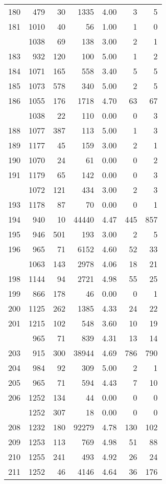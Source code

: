 \documentclass[
]{article}
\begin{document}
\begin{table}
\begin{tabular}[t]{lrrrrrr}
180 & 479 & 30 & 1335 & 4.00 & 3 & 5\\
181 & 1010 & 40 & 56 & 1.00 & 1 & 0\\
\addlinespace
182 & 1038 & 69 & 138 & 3.00 & 2 & 1\\
183 & 932 & 120 & 100 & 5.00 & 1 & 2\\
184 & 1071 & 165 & 558 & 3.40 & 5 & 5\\
185 & 1073 & 578 & 340 & 5.00 & 2 & 5\\
186 & 1055 & 176 & 1718 & 4.70 & 63 & 67\\
\addlinespace
187 & 1038 & 22 & 110 & 0.00 & 0 & 3\\
188 & 1077 & 387 & 113 & 5.00 & 1 & 3\\
189 & 1177 & 45 & 159 & 3.00 & 2 & 1\\
190 & 1070 & 24 & 61 & 0.00 & 0 & 2\\
191 & 1179 & 65 & 142 & 0.00 & 0 & 3\\
\addlinespace
192 & 1072 & 121 & 434 & 3.00 & 2 & 3\\
193 & 1178 & 87 & 70 & 0.00 & 0 & 1\\
194 & 940 & 10 & 44440 & 4.47 & 445 & 857\\
195 & 946 & 501 & 193 & 3.00 & 2 & 5\\
196 & 965 & 71 & 6152 & 4.60 & 52 & 33\\
\addlinespace
197 & 1063 & 143 & 2978 & 4.06 & 18 & 21\\
198 & 1144 & 94 & 2721 & 4.98 & 55 & 25\\
199 & 866 & 178 & 46 & 0.00 & 0 & 1\\
200 & 1125 & 262 & 1385 & 4.33 & 24 & 22\\
201 & 1215 & 102 & 548 & 3.60 & 10 & 19\\
\addlinespace
202 & 965 & 71 & 839 & 4.31 & 13 & 14\\
203 & 915 & 300 & 38944 & 4.69 & 786 & 790\\
204 & 984 & 92 & 309 & 5.00 & 2 & 1\\
205 & 965 & 71 & 594 & 4.43 & 7 & 10\\
206 & 1252 & 134 & 44 & 0.00 & 0 & 0\\
\addlinespace
207 & 1252 & 307 & 18 & 0.00 & 0 & 0\\
208 & 1232 & 180 & 92279 & 4.78 & 130 & 102\\
209 & 1253 & 113 & 769 & 4.98 & 51 & 88\\
210 & 1255 & 241 & 493 & 4.92 & 26 & 24\\
211 & 1252 & 46 & 4146 & 4.64 & 36 & 176\\

\end{tabular}
\end{table}
\end{document}
